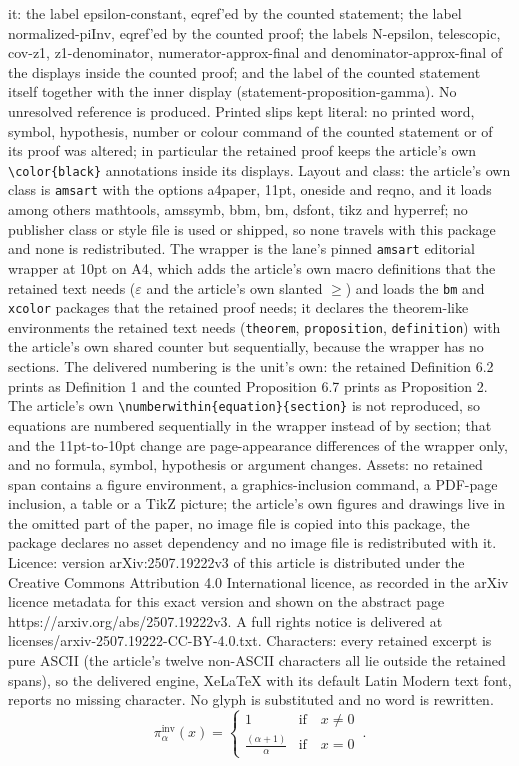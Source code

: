 \documentclass[10pt,a4paper]{amsart}
\newcommand{\eps}{\varepsilon}
\renewcommand{\geq}{\geqslant}
\begin{document}
it: the label epsilon-constant, eqref'ed by the counted statement; the label normalized-piInv, eqref'ed by the counted proof; the labels N-epsilon, telescopic, cov-z1, z1-denominator, numerator-approx-final and denominator-approx-final of the displays inside the counted proof; and the label of the counted statement itself together with the inner display (statement-proposition-gamma). No unresolved reference is produced. Printed slips kept literal: no printed word, symbol, hypothesis, number or colour command of the counted statement or of its proof was altered; in particular the retained proof keeps the article's own \texttt{\textbackslash color\{black\}} annotations inside its displays. Layout and class: the article's own class is \texttt{amsart} with the options a4paper, 11pt, oneside and reqno, and it loads among others mathtools, amssymb, bbm, bm, dsfont, tikz and hyperref; no publisher class or style file is used or shipped, so none travels with this package and none is redistributed. The wrapper is the lane's pinned \texttt{amsart} editorial wrapper at 10pt on A4, which adds the article's own macro definitions that the retained text needs ($\eps$ and the article's own slanted $\geq$) and loads the \texttt{bm} and \texttt{xcolor} packages that the retained proof needs; it declares the theorem-like environments the retained text needs (\texttt{theorem}, \texttt{proposition}, \texttt{definition}) with the article's own shared counter but sequentially, because the wrapper has no sections. The delivered numbering is the unit's own: the retained Definition 6.2 prints as Definition 1 and the counted Proposition 6.7 prints as Proposition 2. The article's own \texttt{\textbackslash numberwithin\{equation\}\{section\}} is not reproduced, so equations are numbered sequentially in the wrapper instead of by section; that and the 11pt-to-10pt change are page-appearance differences of the wrapper only, and no formula, symbol, hypothesis or argument changes. Assets: no retained span contains a figure environment, a graphics-inclusion command, a PDF-page inclusion, a table or a TikZ picture; the article's own figures and drawings live in the omitted part of the paper, no image file is copied into this package, the package declares no asset dependency and no image file is redistributed with it. Licence: version arXiv:2507.19222v3 of this article is distributed under the Creative Commons Attribution 4.0 International licence, as recorded in the arXiv licence metadata for this exact version and shown on the abstract page https://arxiv.org/abs/2507.19222v3. A full rights notice is delivered at licenses/arxiv-2507.19222-CC-BY-4.0.txt. Characters: every retained excerpt is pure ASCII (the article's twelve non-ASCII characters all lie outside the retained spans), so the delivered engine, XeLaTeX with its default Latin Modern text font, reports no missing character. No glyph is substituted and no word is rewritten.
\begin{equation}\label{normalized-piInv}
	\pi^{\text{inv}}_{\alpha}(x)=\begin{cases}
		1&\text{if}\quad x\neq 0\\
		\frac{(\alpha+1)}{\alpha}&\text{if}\quad x=0
	\end{cases}\,.
\end{equation}
\end{document}
